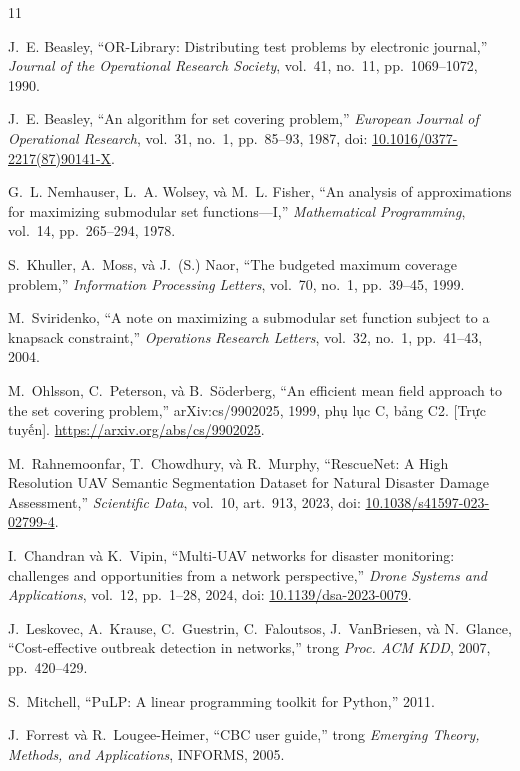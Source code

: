 \documentclass[conference]{IEEEtran}
\begin{document}
\begin{thebibliography}{11}

 J.~E. Beasley, ``OR-Library: Distributing test problems by electronic
journal,'' \emph{Journal of the Operational Research Society}, vol.~41, no.~11, pp.~1069--1072, 1990.

 J.~E. Beasley, ``An algorithm for set covering problem,''
\emph{European Journal of Operational Research}, vol.~31, no.~1, pp.~85--93, 1987,
doi: \href{https://doi.org/10.1016/0377-2217(87)90141-X}{10.1016/0377-2217(87)90141-X}.

 G.~L. Nemhauser, L.~A. Wolsey, và M.~L. Fisher, ``An analysis of
approximations for maximizing submodular set functions---I,'' \emph{Mathematical Programming},
vol.~14, pp.~265--294, 1978.

 S.~Khuller, A.~Moss, và J.~(S.) Naor, ``The budgeted maximum coverage
problem,'' \emph{Information Processing Letters}, vol.~70, no.~1, pp.~39--45, 1999.

 M.~Sviridenko, ``A note on maximizing a submodular set function
subject to a knapsack constraint,'' \emph{Operations Research Letters}, vol.~32, no.~1,
pp.~41--43, 2004.

 M.~Ohlsson, C.~Peterson, và B.~Söderberg, ``An efficient mean field
approach to the set covering problem,'' arXiv:cs/9902025, 1999, phụ lục C, bảng C2.
[Trực tuyến]. \url{https://arxiv.org/abs/cs/9902025}.

 M.~Rahnemoonfar, T.~Chowdhury, và R.~Murphy, ``RescueNet: A High
Resolution UAV Semantic Segmentation Dataset for Natural Disaster Damage Assessment,''
\emph{Scientific Data}, vol.~10, art.~913, 2023,
doi: \href{https://doi.org/10.1038/s41597-023-02799-4}{10.1038/s41597-023-02799-4}.

 I.~Chandran và K.~Vipin, ``Multi-UAV networks for disaster monitoring:
challenges and opportunities from a network perspective,'' \emph{Drone Systems and
Applications}, vol.~12, pp.~1--28, 2024,
doi: \href{https://doi.org/10.1139/dsa-2023-0079}{10.1139/dsa-2023-0079}.

 J.~Leskovec, A.~Krause, C.~Guestrin, C.~Faloutsos, J.~VanBriesen, và
N.~Glance, ``Cost-effective outbreak detection in networks,'' trong \emph{Proc. ACM KDD},
2007, pp.~420--429.

 S.~Mitchell, ``PuLP: A linear programming toolkit for Python,'' 2011.

 J.~Forrest và R.~Lougee-Heimer, ``CBC user guide,'' trong \emph{Emerging Theory,
Methods, and Applications}, INFORMS, 2005.

\end{thebibliography}
\end{document}
